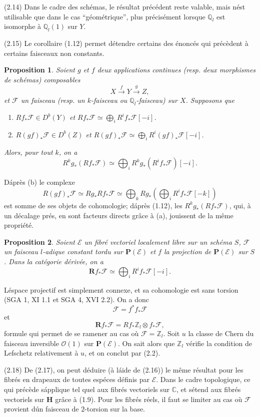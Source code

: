 \documentclass[12pt]{amsart}
\theoremstyle{plain}
\newtheorem{prop}{Proposition}[section]
\theoremstyle{remark}
\newcommand{\cF}{\mathscr{F}}
\newcommand{\cO}{\mathscr{O}}
\newcommand{\cE}{\mathscr{E}}
\newcommand{\Rf}{\mathbf{R}f_*}
\newcommand{\db}{D^b}
\begin{document}
(2.14) Dans le cadre des sch\'emas, le r\'esultat pr\'ec\'edent reste valable, mais n\'est utilisable que dans le cas ``g\'eom\'etrique'', plus pr\'ecis\'ement lorsque $\mathbb{Q}_l$ est isomorphe \`a $\mathbb{Q}_l(1)$ sur $Y$.

(2.15) Le corollaire (1.12) permet d\'etendre certains des \'enonc\'es qui pr\'ec\`edent \`a certains faisceaux non constants.

\begin{prop}\label{prop:2.16}
Soient $g$ et $f$ deux applications continues (resp. deux morphismes de sch\'emas) composables
\[
X \xrightarrow{f} Y \xrightarrow{g} Z,
\]
et $\cF$ un faisceau (resp. un $k$-faisceau ou $\mathbb{Q}_l$-faisceau) sur $X$. Supposons que
\begin{enumerate}
\item[(a)] $Rf_*\cF \in \db(Y)$ et $Rf_*\cF \simeq \bigoplus_i R^if_*\cF[-i]$.
\item[(b)] $R(gf)_*\cF \in \db(Z)$ et $R(gf)_*\cF \simeq \bigoplus_i R^i(gf)_*\cF[-i]$.
\end{enumerate}
Alors, pour tout $k$, on a
\[
R^kg_*(Rf_*\cF) \simeq \bigoplus_i R^kg_*(R^if_*\cF)[-i].
\]
\end{prop}

D\'apr\`es (b) le complexe
\[
R(gf)_*\cF \simeq Rg_*Rf_*\cF \simeq \bigoplus_k Rg_*(\bigoplus_i R^if_*\cF[-k])
\]
est somme de ses objets de cohomologie; d\'apr\`es (1.12), les $R^kg_*(Rf_*\cF)$, qui, \`a un d\'ecalage pr\'es, en sont facteurs directs gr\^ace \`a (a), jouissent de la m\^eme propri\'et\'e.

\begin{prop}\label{prop:2.17}
Soient $\cE$ un fibr\'e vectoriel localement libre sur un sch\'ema $S$, $\cF$ un faisceau $l$-adique constant tordu sur $\mathbf{P}(\cE)$ et $f$ la projection de $\mathbf{P}(\cE)$ sur $S$. Dans la cat\'egorie d\'eriv\'ee, on a
\[
\Rf\cF \simeq \bigoplus_i R^if_*\cF[-i].
\]
\end{prop}

L\'espace projectif est simplement connexe, et sa cohomologie est sans torsion (SGA 1, XI 1.1 et SGA 4, XVI 2.2). On a donc
\[
\cF = f^*f_*\cF
\]
et
\[
\Rf\cF = Rf_*\mathbb{Z}_l \otimes f_*\cF,
\]
formule qui permet de se ramener au cas o\`u $\cF = \mathbb{Z}_l$. Soit $u$ la classe de Chern du faisceau inversible $\cO(1)$ sur $\mathbf{P}(\cE)$. On sait alors que $\mathbb{Z}_l$ v\'erifie la condition de Lefschetz relativement \`a $u$, et on conclut par (2.2).

(2.18) De (2.17), on peut d\'eduire (\`a l\'aide de (2.16)) le m\^eme r\'esultat pour les fibr\'es en drapeaux de toutes esp\'eces d\'efinis par $\cE$. Dans le cadre topologique, ce qui pr\'ec\`ede s\'applique tel quel aux fibr\'es vectoriels sur $\mathbb{C}$, et s\'etend aux fibr\'es vectoriels sur $\mathbf{H}$ gr\^ace \`a (1.9). Pour les fibr\'es r\'eels, il faut se limiter au cas o\`u $\cF$ provient d\'un faisceau de $2$-torsion sur la base.
\end{document}
